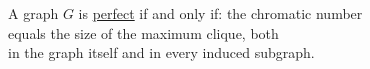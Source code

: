 \documentclass[preview]{standalone}
\begin{document}
\begin{lalign}
A graph $G$ is \underline{perfect} if and only if: the chromatic number \\ equals the size of the maximum clique, both\\in the graph itself and in every induced subgraph.
\end{lalign}
\end{document}
